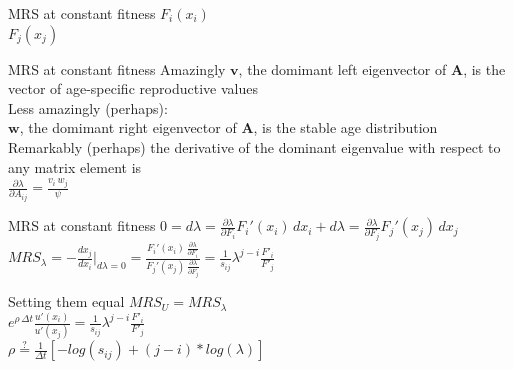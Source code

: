 \documentclass{beamer}
\begin{document}
\begin{frame}{MRS at constant fitness}
  $F_i(x_i)$\\
  \pause
  \vspace{1.5cm}
  $F_j(x_j)$\\
\end{frame}

\begin{frame}{MRS at constant fitness}
  Amazingly $\mathbf{v}$, the domimant left eigenvector of $\mathbf{A}$, is the vector of age-specific reproductive values\\
  \vspace{.5cm}
  Less amazingly (perhaps):\\
  \vspace{.5cm}
  $\mathbf{w}$, the domimant right eigenvector of $\mathbf{A}$, is the stable age distribution\\
  \vspace{.5cm}
  Remarkably (perhaps) the derivative of the dominant eigenvalue with respect to any matrix element is\\
  \vspace{.5cm}
  $\frac{\partial \lambda}{\partial A_{ij}} = \frac{v_i \, w_j}{\psi}$
\end{frame}


\begin{frame}{MRS at constant fitness}
  $0 = d\lambda = \frac{\partial \lambda}{\partial F_i} F_i'(x_i) \, dx_i + d\lambda = \frac{\partial \lambda}{\partial F_j} F_j'(x_j) \, dx_j$\\
  \vspace{.5cm}
  \pause
  $MRS_{\lambda} = -\frac{dx_j}{dx_i} \bigg\rvert_{d\lambda=0} = \frac{F_i'(x_i) \, \frac{\partial \lambda}{\partial F_i}}{F_j'(x_j) \, \frac{\partial \lambda}{\partial F_j}} = \frac{1}{s_{ij}} \lambda^{j-i} \frac{F'_i}{F'_j}$ 
\end{frame}

\begin{frame}{Setting them equal}
  $MRS_{U} = MRS_{\lambda}$\\
  \vspace{.5cm}
  \pause
  $e^{\rho \, \Delta t} \frac{u'(x_i)}{u'(x_j)} = \frac{1}{s_{ij}} \lambda^{j-i} \frac{F'_i}{F'_j}$\\
  \vspace{.5cm}
  \pause
  $\rho \stackrel{?}{=} \frac{1}{\Delta t} [-log(s_{ij}) + (j-i)*log(\lambda)]$\\
\end{frame}
\end{document}

